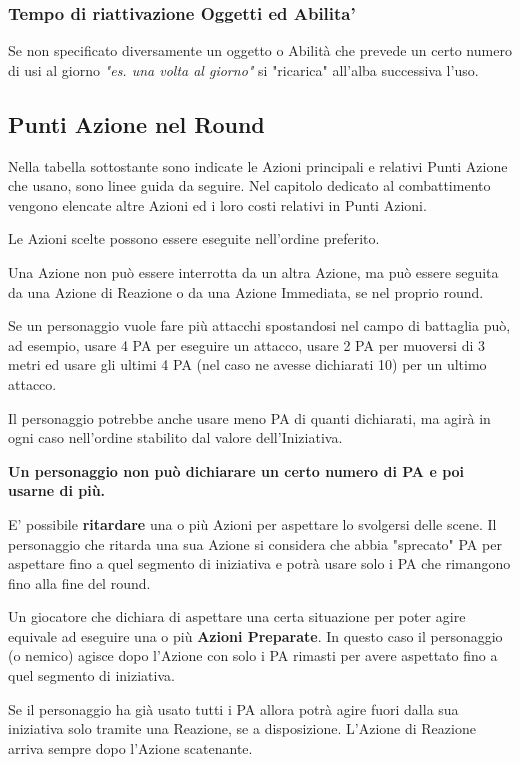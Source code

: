 \documentclass[12pt,a4paper,twoside,openany]{book}
\begin{document}
\begin{multicols}{2}
\subsubsection{Tempo di riattivazione Oggetti ed Abilita'}\label{temporiattivazioneoggetti}

Se non specificato diversamente un oggetto o Abilità che prevede un certo numero di usi al giorno \textit{"es. una volta al giorno"} si "ricarica" all'alba successiva l'uso.

\subsection{Punti Azione nel Round}\label{azioninelround}

Nella tabella sottostante sono indicate le Azioni principali e relativi Punti Azione che usano, sono linee guida da seguire. Nel capitolo dedicato al combattimento vengono elencate altre Azioni ed i loro costi relativi in Punti Azioni.

Le Azioni scelte possono essere eseguite nell'ordine preferito.

Una Azione non può essere interrotta da un altra Azione, ma può essere seguita da una Azione di Reazione o da una Azione Immediata, se nel proprio round.

Se un personaggio vuole fare più attacchi spostandosi nel campo di battaglia può, ad esempio, usare 4 PA per eseguire un attacco, usare 2 PA per muoversi di 3 metri ed usare gli ultimi 4 PA (nel caso ne avesse dichiarati 10) per un ultimo attacco.

Il personaggio potrebbe anche usare meno PA di quanti dichiarati, ma agirà in ogni caso nell'ordine stabilito dal valore dell'Iniziativa.

\textbf{Un personaggio non può dichiarare un certo numero di PA e poi usarne di più.}

E' possibile \textbf{ritardare} una o più Azioni per aspettare lo svolgersi delle scene. Il personaggio che ritarda una sua Azione si considera che abbia "sprecato" PA per aspettare fino a quel segmento di iniziativa e potrà usare solo i PA che rimangono fino alla fine del round.

Un giocatore che dichiara di aspettare una certa situazione per poter agire equivale ad eseguire una o più \textbf{Azioni Preparate}. In questo caso il personaggio (o nemico) agisce dopo l'Azione con solo i PA rimasti per avere aspettato fino a quel segmento di iniziativa.

Se il personaggio ha già usato tutti i PA allora potrà agire fuori dalla sua iniziativa solo tramite una Reazione, se a disposizione. L'Azione di Reazione arriva sempre dopo l'Azione scatenante.

\bigskip

\end{multicols}
\end{document}
